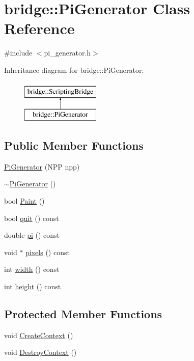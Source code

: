 \hypertarget{classbridge_1_1_pi_generator}{
\section{bridge::PiGenerator Class Reference}
\label{classbridge_1_1_pi_generator}
}


{\ttfamily \#include $<$pi\_\-generator.h$>$}

Inheritance diagram for bridge::PiGenerator:\begin{figure}[H]
\begin{center}
\leavevmode
\includegraphics[height=2cm]{classbridge_1_1_pi_generator}
\end{center}
\end{figure}
\subsection*{Public Member Functions}
\begin{DoxyCompactItemize}
\item 
\hyperlink{classbridge_1_1_pi_generator_a1f76a8c23b9f71c440d8a86e91f9b177}{PiGenerator} (NPP npp)
\item 
\hyperlink{classbridge_1_1_pi_generator_ae2369ad51a1680d21ff001404a8a84b5}{$\sim$PiGenerator} ()
\item 
bool \hyperlink{classbridge_1_1_pi_generator_a7d6deb8aca71aa7c3692894f489afd30}{Paint} ()
\item 
bool \hyperlink{classbridge_1_1_pi_generator_a756bd50f86283c0970abbb1ce0d0a322}{quit} () const 
\item 
double \hyperlink{classbridge_1_1_pi_generator_ac477983021d094e067edb005af305212}{pi} () const 
\item 
void $\ast$ \hyperlink{classbridge_1_1_pi_generator_a51490d5ee5ac9c1beb10459643f7083a}{pixels} () const 
\item 
int \hyperlink{classbridge_1_1_pi_generator_ab96bd1df955862228ca1c2a42344debc}{width} () const 
\item 
int \hyperlink{classbridge_1_1_pi_generator_a4f079f180ee84d53cab6df3f5baf7492}{height} () const 
\end{DoxyCompactItemize}
\subsection*{Protected Member Functions}
\begin{DoxyCompactItemize}
\item 
void \hyperlink{classbridge_1_1_pi_generator_aa5be4efa2d7fe286582ccec734619db4}{CreateContext} ()
\item 
void \hyperlink{classbridge_1_1_pi_generator_ad0299e34e6e407bdb4b10dd6b26772e1}{DestroyContext} ()
\end{DoxyCompactItemize}
